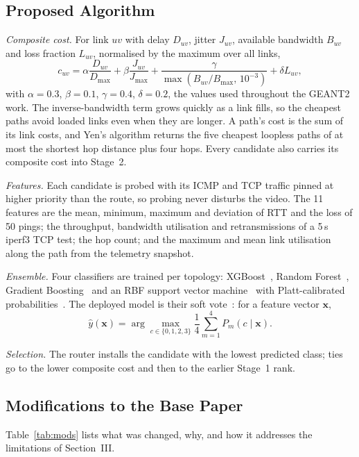 \documentclass[conference,a4paper]{IEEEtran}
\begin{document}
\subsection{Proposed Algorithm}
\textit{Composite cost.} For link $uv$ with delay $D_{uv}$, jitter $J_{uv}$, available bandwidth $B_{uv}$ and loss
fraction $L_{uv}$, normalised by the maximum over all links,
\begin{equation}
c_{uv} = \alpha\frac{D_{uv}}{D_{\max}} + \beta\frac{J_{uv}}{J_{\max}} +
\frac{\gamma}{\max\!\left(B_{uv}/B_{\max},\,10^{-3}\right)} + \delta L_{uv},
\label{eq:cost}
\end{equation}
with $\alpha=0.3$, $\beta=0.1$, $\gamma=0.4$, $\delta=0.2$, the values used throughout the GEANT2 work. The
inverse-bandwidth term grows quickly as a link fills, so the cheapest paths avoid loaded links even when they are
longer. A path's cost is the sum of its link costs, and Yen's algorithm returns the five cheapest loopless paths of
at most the shortest hop distance plus four hops. Every candidate also carries its composite cost into Stage~2.

\textit{Features.} Each candidate is probed with its ICMP and TCP traffic pinned at higher priority than the route,
so probing never disturbs the video. The 11 features are the mean, minimum, maximum and deviation of RTT and the
loss of 50 pings; the throughput, bandwidth utilisation and retransmissions of a 5\,s iperf3 TCP test; the hop
count; and the maximum and mean link utilisation along the path from the telemetry snapshot.

\textit{Ensemble.} Four classifiers are trained per topology: XGBoost~\cite{chen2016xgboost}, Random
Forest~\cite{breiman2001rf}, Gradient Boosting~\cite{friedman2001gbm} and an RBF support vector
machine~\cite{cortes1995svm} with Platt-calibrated probabilities~\cite{platt1999probabilistic}. The deployed model
is their soft vote~\cite{kuncheva2004combining}: for a feature vector $\mathbf{x}$,
\begin{equation}
\hat{y}(\mathbf{x}) = \arg\max_{c\in\{0,1,2,3\}} \frac{1}{4}\sum_{m=1}^{4} P_m(c\mid\mathbf{x}).
\label{eq:vote}
\end{equation}

\textit{Selection.} The router installs the candidate with the lowest predicted class; ties go to the lower
composite cost and then to the earlier Stage~1 rank.

\subsection{Modifications to the Base Paper}
Table~\ref{tab:mods} lists what was changed, why, and how it addresses the limitations of Section~III.
\end{document}
